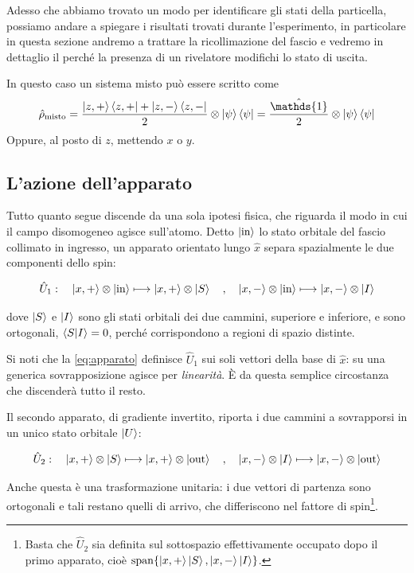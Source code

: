Adesso che abbiamo trovato un modo per identificare gli stati della particella, possiamo andare a spiegare i risultati trovati durante l'esperimento, in particolare in questa sezione andremo a trattare la ricollimazione del fascio e vedremo in dettaglio il perché la presenza di un rivelatore modifichi lo stato di uscita.

In questo caso un sistema misto può essere scritto come 
\begin{equation}
    \hat{\rho}_{\text{misto}} = \frac{\ketbra{z, +}{z, +} + \ketbra{z, -}{z, -}}{2} \otimes \ketbra{\psi}{\psi} = \frac{\hat{\mathds{1}}}{2} \otimes \ketbra{\psi}{\psi}
\end{equation}
Oppure, al posto di $z$, mettendo $x$ o $y$.

\subsection*{L'azione dell'apparato}

Tutto quanto segue discende da una sola ipotesi fisica, che riguarda il modo
in cui il campo disomogeneo agisce sull'atomo. Detto $\ket{\text{in}}$ lo
stato orbitale del fascio collimato in ingresso, un apparato orientato lungo
$\hat{x}$ separa spazialmente le due componenti dello spin:
%
\begin{tcolorbox}[colback=black!5!white, colframe=black!45!white, boxrule=0.8pt]
\begin{equation}
    \hat{U}_1 : \quad
    \ket{x,+} \otimes \ket{\text{in}} \longmapsto \ket{x,+} \otimes \ket{S}
    \quad , \quad
    \ket{x,-} \otimes \ket{\text{in}} \longmapsto \ket{x,-} \otimes \ket{I}
    \label{eq:apparato}
\end{equation}
\end{tcolorbox}
%
dove $\ket{S}$ e $\ket{I}$ sono gli stati orbitali dei due cammini, superiore
e inferiore, e sono ortogonali, $\braket{S|I} = 0$, perché corrispondono a
regioni di spazio distinte.

Si noti che la \eqref{eq:apparato} definisce $\hat{U}_1$ sui soli vettori
della base di $\hat{x}$: su una generica sovrapposizione agisce per
\emph{linearità}. È da questa semplice circostanza che discenderà tutto il
resto.

Il secondo apparato, di gradiente invertito, riporta i due cammini a
sovrapporsi in un unico stato orbitale $\ket{U}$:
%
\begin{tcolorbox}[colback=black!5!white, colframe=black!45!white, boxrule=0.8pt]
\begin{equation}
    \hat{U}_2 : \quad
    \ket{x,+} \otimes \ket{S} \longmapsto \ket{x,+} \otimes \ket{\text{out}}
    \quad , \quad
    \ket{x,-} \otimes \ket{I} \longmapsto \ket{x,-} \otimes \ket{\text{out}}
    \label{eq:ricombinatore}
\end{equation}
\end{tcolorbox}
%
Anche questa è una trasformazione unitaria: i due vettori di partenza sono
ortogonali e tali restano quelli di arrivo, che differiscono nel fattore di
spin\footnote{Basta che $\hat{U}_2$ sia definita sul sottospazio
effettivamente occupato dopo il primo apparato, cioè
$\operatorname{span}\{\ket{x,+}\ket{S}, \ket{x,-}\ket{I}\}$.}.


